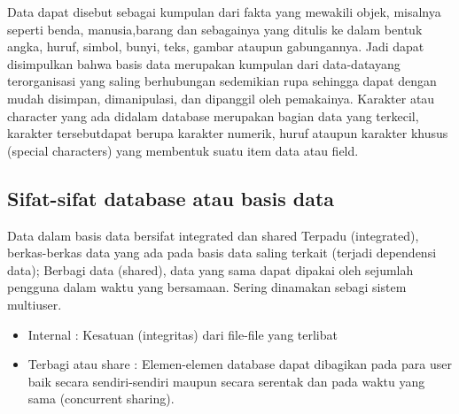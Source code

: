 	Data dapat disebut sebagai kumpulan dari fakta yang mewakili objek, misalnya seperti benda, manusia,barang dan sebagainya yang ditulis ke dalam bentuk angka, huruf, simbol, bunyi, teks, gambar ataupun gabungannya. Jadi dapat disimpulkan bahwa basis data merupakan kumpulan dari data-datayang terorganisasi yang saling berhubungan sedemikian rupa sehingga dapat dengan mudah disimpan, dimanipulasi, dan dipanggil oleh pemakainya. Karakter atau character yang ada didalam database merupakan bagian data yang terkecil, karakter tersebutdapat berupa karakter numerik, huruf ataupun karakter khusus (special characters) yang membentuk suatu item data atau field.

\subsection {Sifat-sifat database atau basis data}
	Data dalam basis data bersifat integrated dan shared Terpadu (integrated), berkas-berkas data yang ada pada basis data saling terkait (terjadi dependensi data);
	Berbagi data (shared), data yang sama dapat dipakai oleh sejumlah pengguna dalam waktu yang bersamaan. Sering dinamakan sebagi sistem multiuser.
	\begin{itemize}
		\item Internal : Kesatuan (integritas) dari file-file yang terlibat
		\item Terbagi atau share : Elemen-elemen database dapat dibagikan pada para user baik secara sendiri-sendiri maupun secara serentak dan pada waktu yang sama (concurrent sharing).
	\end{itemize}
 
